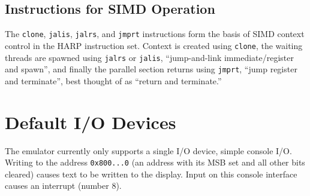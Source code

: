 \documentclass[10pt,letterpaper]{article}
\begin{document}

\subsection{Instructions for SIMD Operation}
The \texttt{clone}, \texttt{jalis}, \texttt{jalrs}, and \texttt{jmprt} instructions form the basis of SIMD context control in the HARP instruction set.
Context is created using \texttt{clone}, the waiting threads are spawned using \texttt{jalrs} or \texttt{jalis}, ``jump-and-link immediate/register and spawn'', and finally the parallel section returns using \texttt{jmprt}, ``jump register and terminate'', best thought of as ``return and terminate.''

\section{Default I/O Devices}
The emulator currently only supports a single I/O device, simple console I/O.
Writing to the address \texttt{0x800...0} (an address with its MSB set and all other bits cleared) causes text to be written to the display.
Input on this console interface causes an interrupt (number 8).
\end{document}
